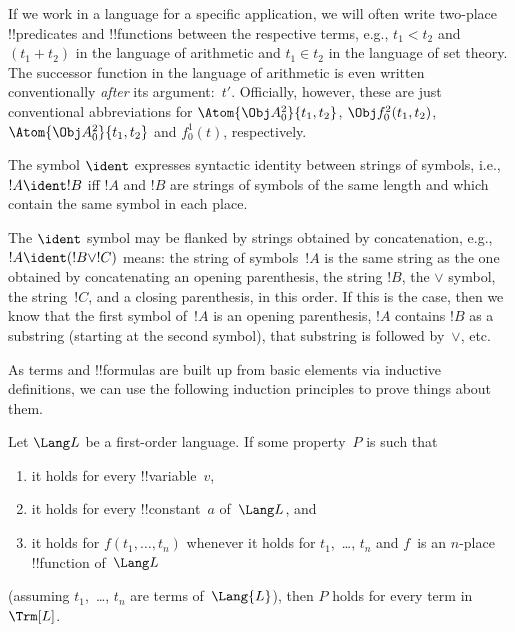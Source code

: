 \documentclass[../../../include/open-logic-section]{subfiles}
\begin{document}
If we work in a language for a specific application, we will often
write two-place !!{predicate}s and !!{function}s between the
respective terms, e.g., $t_1 < t_2$ and $(t_1 + t_2)$ in the language
of arithmetic and $t_1 \in t_2$ in the language of set theory.  The
successor function in the language of arithmetic is even written
conventionally \emph{after} its argument:~$t'$.  Officially, however,
these are just conventional abbreviations for $\Atom{\Obj A^2_0}{t_1, t_2}$,
$\Obj f^2_0(t_1, t_2)$, $\Atom{\Obj A^2_0}{t_1, t_2}$ and $f^1_0(t)$,
respectively.

\begin{defn}
The symbol $\ident$ expresses syntactic identity between strings of
symbols, i.e., $!A \ident !B$ iff $!A$ and $!B$ are strings of symbols
of the same length and which contain the same symbol in each place.
\end{defn}

The $\ident$ symbol may be flanked by strings obtained by
concatenation, e.g., $!A \ident (!B \lor !C)$ means: the string of
symbols~$!A$ is the same string as the one obtained by concatenating
an opening parenthesis, the string $!B$, the $\lor$ symbol, the
string~$!C$, and a closing parenthesis, in this order. If this is the
case, then we know that the first symbol of~$!A$ is an opening
parenthesis, $!A$ contains $!B$ as a substring (starting at the second
symbol), that substring is followed by~$\lor$, etc.

As terms and !!{formula}s are built up from basic elements via inductive
definitions, we can use the following induction principles to prove
things about them.

\begin{lem}
    Let $\Lang L$ be a first-order language.
    If some property~$P$ is such that
    \begin{enumerate}
        \item it holds for every !!{variable}~$v$,
        \item it holds for every !!{constant}~$a$ of~$\Lang L$, and
        \item it holds for $f(t_1,\dotsc,t_n)$ whenever it holds for
        $t_1$,~\dots, $t_n$ and $f$~is an $n$-place
            !!{function} of~$\Lang L$
    \end{enumerate}
    (assuming $t_1$,~\dots, $t_n$ are terms of~$\Lang{L}$),
    then $P$ holds for every term in~$\Trm[L]$.
\end{lem}
\end{document}
